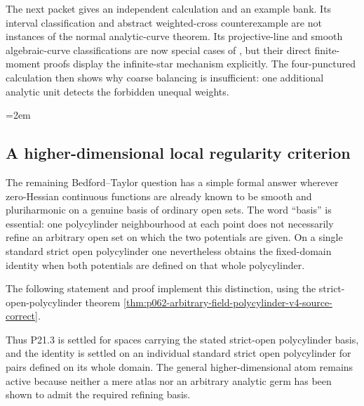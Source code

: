 The next packet gives an independent calculation and an example bank.  Its
interval classification and abstract weighted-cross counterexample are not
instances of the normal analytic-curve theorem.  Its projective-line and
smooth algebraic-curve classifications are now special cases of
, but their
direct finite-moment proofs display the infinite-star mechanism explicitly.
The four-punctured calculation then shows why coarse balancing is insufficient:
one additional analytic unit detects the forbidden unequal weights.


\begingroup
\emergencystretch=2em

\endgroup

\subsection{A higher-dimensional local regularity criterion}
\label{sec:ch16-polycylinder-bt-independence}

The remaining Bedford--Taylor question has a simple formal answer wherever
zero-Hessian continuous functions are already known to be smooth and
pluriharmonic on a genuine basis of ordinary open sets.  The word
``basis'' is essential: one polycylinder neighbourhood at each point does
not necessarily refine an arbitrary open set on which the two potentials
are given.  On a single standard strict open polycylinder one nevertheless
obtains the fixed-domain identity when both potentials are defined on that
whole polycylinder.

The following statement and proof implement this distinction, using the
strict-open-polycylinder theorem
\cref{thm:p062-arbitrary-field-polycylinder-v4-source-correct}.




Thus P21.3 is settled for spaces carrying the stated strict-open
polycylinder basis, and the identity is settled on an individual standard
strict open polycylinder for pairs defined on its whole domain.  The general
higher-dimensional atom remains active because neither a mere atlas nor an
arbitrary analytic germ has been shown to admit the required refining basis.

